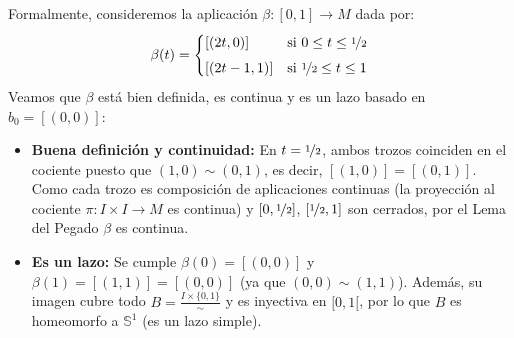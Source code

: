 \documentclass[12pt]{article}
\begin{document}
\begin{ejercicio}
        Formalmente, consideremos la aplicación $\beta:[0,1]\to M$ dada por:
        \begin{equation*}
            \beta(t) = \begin{cases}
                [(2t, 0)] & \text{si } 0\leq t \leq \nicefrac{1}{2} \\[4pt]
                [(2t-1, 1)] & \text{si } \nicefrac{1}{2}\leq t \leq 1
            \end{cases}
        \end{equation*}
        Veamos que $\beta$ está bien definida, es continua y es un lazo basado en $b_0 = [(0,0)]$:
        \begin{itemize}
            \item \textbf{Buena definición y continuidad:} En $t = \nicefrac{1}{2}$, ambos trozos coinciden en el cociente puesto que $(1,0) \sim (0,1)$, es decir, $[(1,0)] = [(0,1)]$. Como cada trozo es composición de aplicaciones continuas (la proyección al cociente $\pi:I\times I \to M$ es continua) y $[0,\nicefrac{1}{2}]$, $[\nicefrac{1}{2},1]$ son cerrados, por el Lema del Pegado $\beta$ es continua.
            \item \textbf{Es un lazo:} Se cumple $\beta(0) = [(0,0)]$ y $\beta(1) = [(1,1)] = [(0,0)]$ (ya que $(0,0)\sim (1,1)$). Además, su imagen cubre todo $B = \frac{I\times\{0,1\}}{\sim}$ y es inyectiva en $[0,1[$, por lo que $B$ es homeomorfo a $\mathbb{S}^1$ (es un lazo simple).
        \end{itemize}


\end{ejercicio}
\end{document}
